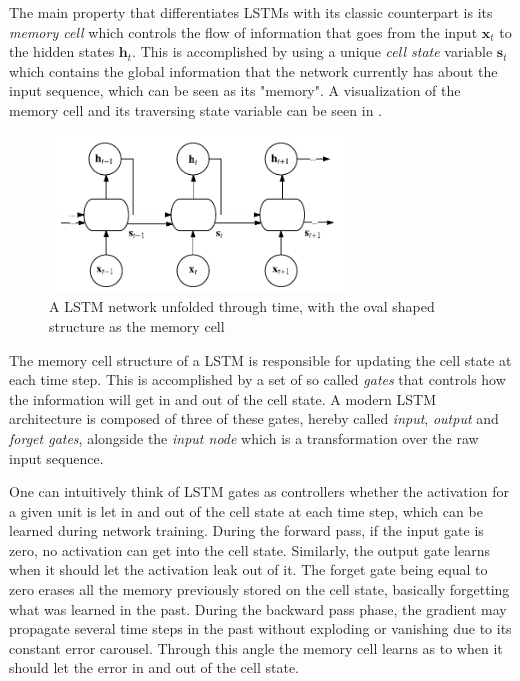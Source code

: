 \documentclass{kththesis}
\begin{document}
The main property that differentiates LSTMs with its classic counterpart is its \emph{memory cell} which controls the flow of information that goes from the input $\mathbf{x}_t$ to the hidden states $\mathbf{h}_t$. This is accomplished by using a unique \emph{cell state} variable $\mathbf{s}_t$ which contains the global information that the network currently has about the input sequence, which can be seen as its "memory". A visualization of the memory cell and its traversing state variable can be seen in .

\begin{figure}[h]
    \centering
    \includegraphics[width=0.7\textwidth,keepaspectratio]{figures/lstm.pdf}
    \caption{A LSTM network unfolded through time, with the oval shaped structure as the memory cell}
    \label{fig:lstm}
\end{figure}

The memory cell structure of a LSTM is responsible for updating the cell state at each time step. This is accomplished by a set of so called \emph{gates} that controls how the information will get in and out of the cell state. A modern LSTM architecture is composed of three of these gates, hereby called \emph{input}, \emph{output} and \emph{forget gates}, alongside the \emph{input node} which is a transformation over the raw input sequence. 

One can intuitively think of LSTM gates as controllers whether the activation for a given unit is let in and out of the cell state at each time step, which can be learned during network training. During the forward pass, if the input gate is zero, no activation can get into the cell state. Similarly, the output gate learns when it should let the activation leak out of it. The forget gate being equal to zero erases all the memory previously stored on the cell state, basically forgetting what was learned in the past. During the backward pass phase, the gradient may propagate several time steps in the past without exploding or vanishing due to its constant error carousel. Through this angle the memory cell learns as to when it should let the error in and out of the cell state.
\end{document}
